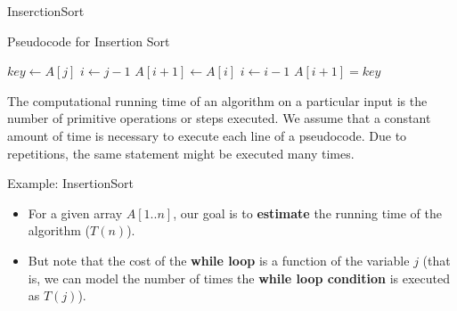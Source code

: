 \begin{frame}{InserctionSort}

  \begin{block}{Pseudocode for Insertion Sort}
\begin{scriptsize}
    \begin{algorithmic}
         \State $key \gets A[j]$                 
         \State $i \gets j-1$                    
            \State $A[i+1] \gets A[i]$           
            \State $i \gets i - 1$               
         \EndWhile
         \State $A[i+1] = key$                   
       \EndFor
    \EndProcedure
    \end{algorithmic}
  \end{scriptsize}  
  \end{block}
\end{frame} 

\begin{frame}
  The computational running time of an algorithm on a particular input is the
  number of primitive operations or steps executed. \pause We
  assume that a constant amount of time is necessary to
  execute each line of a pseudocode. \pause Due to repetitions, the
  same statement might be executed many times. 

  \begin{block}{Example: InsertionSort}
    \begin{itemize}
    \item For a given array $A[1..n]$, our goal is to
      {\bf estimate} the running time of the algorithm ($T(n)$).

    \item But note that the cost of the {\bf while loop} is
      a function of the variable $j$ (that is, we can
      model the number of times the {\bf while loop condition} is executed
      as $T(j)$).
    \end{itemize}
  \end{block}
\end{frame}



